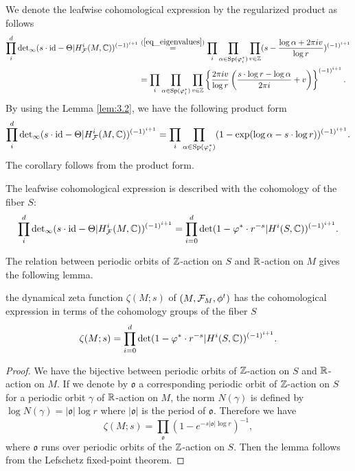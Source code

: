 We denote the leafwise cohomological expression by the regularized product as follows
\begin{equation*}
\begin{split}
    \prod_{i}^{d}{\mathrm{det}}_{\infty}(s\cdot\mbox{id}-\Theta|H^{i}_{{\mathcal{F}}}(M,{\mathbb{C}}))^{(-1)^{i+1}}&\overset{(\ref{eq_eigenvalues})}{=}\prod_{i}\prod_{\alpha\in{\mathrm{Sp}}(\varphi^{*}_{i})}\prod_{v\in{\mathbb{Z}}} (s-\frac{\log{\alpha}+2\pi{i}{v}}{\log{r}})^{(-1)^{i+1}}\\
    &=\prod_{i}\prod_{\alpha\in{\mathrm{Sp}}(\varphi^{*}_{i})}\prod_{v\in{\mathbb{Z}}}  \left\{ \frac{2\pi{i}{v}}{\log{r}}\left(\frac{s\cdot\log{r}-\log \alpha}{2{\pi}{i}}+v\right) \right\}^{(-1)^{i+1}}.
\end{split}
\end{equation*}
By using the Lemma \ref{lem:3.2}, we have the following product form
\begin{equation*}
    \prod_{i}^{d}{\mathrm{det}}_{\infty}(s\cdot\mbox{id}-\Theta|H^{i}_{{\mathcal{F}}}(M,{\mathbb{C}}))^{(-1)^{i+1}}=\prod_{i}\prod_{\alpha\in{\mathrm{Sp}}(\varphi^{*}_{i})}(1-\exp(\log\alpha-s\cdot\log{r}))^{(-1)^{i+1}}.
\end{equation*}
The corollary follows from the product form.
\begin{corollary}
\label{cor:3.2.1}
The leafwise cohomological expression is described with the cohomology of the fiber $S$:
\begin{equation}\label{eq:3.5}
    \prod_{i}^{d}{\mathrm{det}}_{\infty}(s\cdot\mbox{id}-\Theta|H^{i}_{{\mathcal{F}}}(M,{\mathbb{C}}))^{(-1)^{i+1}} =\prod_{i=0}^{d}{\mathrm{det}}(1-\varphi^{*}\cdot r^{-s}|H^{i}(S,{\mathbb{C}}))^{(-1)^{i+1}}.
\end{equation}
\end{corollary}

The relation between periodic orbits of ${\mathbb{Z}}$-action on $S$ and ${\mathbb{R}}$-action on $M$ gives the following lemma.

\begin{lemma}
the dynamical zeta function $\zeta(M;s)$ of $(M,{\mathcal{F}}_{M},\phi^{t})$ has the cohomological expression in terms of the cohomology groups of the fiber $S$
\begin{equation}\label{eq:3.6}
    \zeta(M;s) =\prod_{i=0}^{d}{\mathrm{det}}(1-\varphi^{*}\cdot r^{-s}|H^{i}(S,{\mathbb{C}}))^{(-1)^{i+1}}.
\end{equation}
\end{lemma}

\begin{proof}
We have the bijective between periodic orbits of ${\mathbb{Z}}$-action on $S$ and ${\mathbb{R}}$-action on $M$.
If we denote by $\mathfrak{o}$ a corresponding periodic orbit of ${\mathbb{Z}}$-action on $S$ for a periodic orbit $\gamma$ of ${\mathbb{R}}$-action on $M$, the norm $N(\gamma)$ is defined by $\log{N(\gamma)}=|\mathfrak{o}|\log{r}$ where $|\mathfrak{o}|$ is the period of $\mathfrak{o}$.
Therefore we have
\begin{equation*}
    \zeta(M;s)=\prod_{\mathfrak{o}}(1-e^{-s|\mathfrak{o}|\log{r}})^{-1},
\end{equation*}
where $\mathfrak{o}$ runs over periodic orbits of the ${\mathbb{Z}}$-action on $S$.
Then the lemma follows from the Lefschetz fixed-point theorem.
\end{proof}

